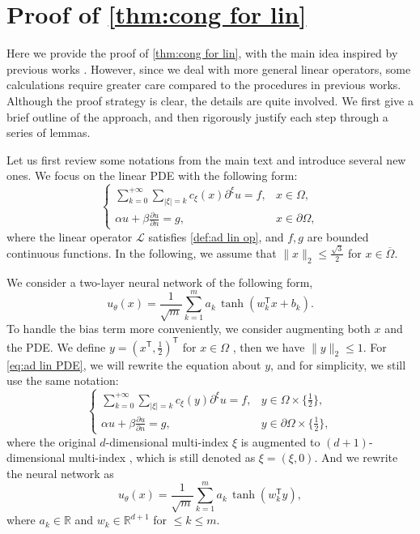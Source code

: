 \documentclass{article}
\newcommand{\T}{\mathsf{T}}
\begin{document}
\section{Proof of \texorpdfstring{\cref{thm:cong for lin}}{Theorem \ref{thm:cong for lin}}}\label{sec:proof cong for lin}
Here we provide the proof of \cref{thm:cong for lin}, with the main idea inspired by previous works \cite{GD_cong_PINN,xu2024convergence}. 
However, since we deal with more general linear operators, some calculations require greater care compared to the procedures in previous works.
Although the proof strategy is clear, the details are quite involved.
We first give a brief outline of the approach, and then rigorously justify each step through a series of lemmas.

Let us first review some notations from the main text and introduce several new ones.
We focus on the linear PDE with the following form:
\begin{equation}
    \begin{cases}
        \sum_{k=0}^{+\infty} \sum_{|\xi|=k} c_{\xi}(x) \partial^\xi u = f, & x \in \Omega, \\
        \alpha u+\beta \frac{\partial u}{\partial n} = g, & x \in \partial\Omega,\label{eq:ad lin PDE}
    \end{cases}   
\end{equation}
where the linear operator $\mathcal{L}$ satisfies \cref{def:ad lin op}, and $f, g$ are bounded continuous functions.
In the following, we assume that $\|x\|_{2}\le \frac{\sqrt{3}}{2}$ for  $x\in \overline\Omega$.

We consider a two-layer neural network of the following form,
\begin{equation*}
u_{\theta}(x) = \frac{1}{\sqrt{m}}\sum_{k=1}^{m} a_k \, \tanh(w_k^\T x+b_k).
\end{equation*}
To handle the bias term more conveniently, we consider augmenting both \( x \) and the PDE.
We define $y=(x^\T, \frac{1}{2})^\T$ for $x\in \Omega$ , then we have $\|y\|_{2}\le 1$.
For \cref{eq:ad lin PDE}, we will rewrite the equation about $y$, and for simplicity, we still use the same notation:
\begin{equation}
    \begin{cases}
        \sum_{k=0}^{+\infty} \sum_{|\xi|=k} c_{\xi}(y) \partial^\xi u = f, & y \in \Omega\times \{\frac{1}{2}\}, \\
        \alpha u+\beta \frac{\partial u}{\partial n} = g, & y \in \partial\Omega\times \{\frac{1}{2}\},\label{eq:ad lin PDE2}
    \end{cases}   
\end{equation}
where the original \(d\)-dimensional multi-index $\xi$ is augmented to \((d+1)\)-dimensional multi-index , which is still denoted as $\xi=(\xi,0)$.
And we rewrite the neural network as 
\begin{equation}
u_{\theta}(x) = \frac{1}{\sqrt{m}}\sum_{k=1}^{m} a_k \, \tanh(w_k^\T y), \label{eq:nn without bias}
\end{equation}
where $a_k\in \mathbb{R}$ and $w_k\in \mathbb{R}^{d+1}$ for $\le k\le m$.
\end{document}
